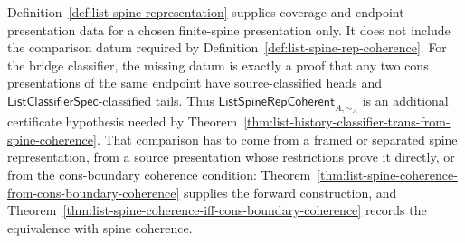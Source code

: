 \begin{principle}
\label{thm:list-spine-rep-unframed-coherence-obstruction}
Definition~\ref{def:list-spine-representation} supplies coverage and endpoint presentation data for a chosen finite-spine presentation only. It does not include the comparison datum required by Definition~\ref{def:list-spine-rep-coherence}. For the bridge classifier, the missing datum is exactly a proof that any two cons presentations of the same endpoint have source-classified heads and $\mathsf{ListClassifierSpec}$-classified tails. Thus $\mathsf{ListSpineRepCoherent}_{A,\sim_A}$ is an additional certificate hypothesis needed by Theorem~\ref{thm:list-history-classifier-trans-from-spine-coherence}. That comparison has to come from a framed or separated spine representation, from a source presentation whose restrictions prove it directly, or from the cons-boundary coherence condition: Theorem~\ref{thm:list-spine-coherence-from-cons-boundary-coherence} supplies the forward construction, and Theorem~\ref{thm:list-spine-coherence-iff-cons-boundary-coherence} records the equivalence with spine coherence.
\end{principle}

